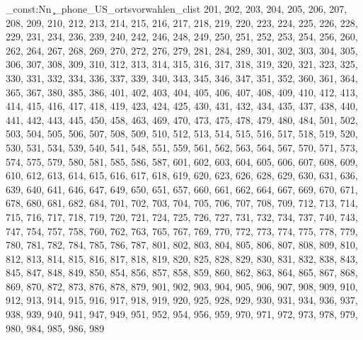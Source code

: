 \clist_const:Nn \c_phone_US_ortsvorwahlen_clist {201,
202,
203,
204,
205,
206,
207,
208,
209,
210,
212,
213,
214,
215,
216,
217,
218,
219,
220,
223,
224,
225,
226,
228,
229,
231,
234,
236,
239,
240,
242,
246,
248,
249,
250,
251,
252,
253,
254,
256,
260,
262,
264,
267,
268,
269,
270,
272,
276,
279,
281,
284,
289,
301,
302,
303,
304,
305,
306,
307,
308,
309,
310,
312,
313,
314,
315,
316,
317,
318,
319,
320,
321,
323,
325,
330,
331,
332,
334,
336,
337,
339,
340,
343,
345,
346,
347,
351,
352,
360,
361,
364,
365,
367,
380,
385,
386,
401,
402,
403,
404,
405,
406,
407,
408,
409,
410,
412,
413,
414,
415,
416,
417,
418,
419,
423,
424,
425,
430,
431,
432,
434,
435,
437,
438,
440,
441,
442,
443,
445,
450,
458,
463,
469,
470,
473,
475,
478,
479,
480,
484,
501,
502,
503,
504,
505,
506,
507,
508,
509,
510,
512,
513,
514,
515,
516,
517,
518,
519,
520,
530,
531,
534,
539,
540,
541,
548,
551,
559,
561,
562,
563,
564,
567,
570,
571,
573,
574,
575,
579,
580,
581,
585,
586,
587,
601,
602,
603,
604,
605,
606,
607,
608,
609,
610,
612,
613,
614,
615,
616,
617,
618,
619,
620,
623,
626,
628,
629,
630,
631,
636,
639,
640,
641,
646,
647,
649,
650,
651,
657,
660,
661,
662,
664,
667,
669,
670,
671,
678,
680,
681,
682,
684,
701,
702,
703,
704,
705,
706,
707,
708,
709,
712,
713,
714,
715,
716,
717,
718,
719,
720,
721,
724,
725,
726,
727,
731,
732,
734,
737,
740,
743,
747,
754,
757,
758,
760,
762,
763,
765,
767,
769,
770,
772,
773,
774,
775,
778,
779,
780,
781,
782,
784,
785,
786,
787,
801,
802,
803,
804,
805,
806,
807,
808,
809,
810,
812,
813,
814,
815,
816,
817,
818,
819,
820,
825,
828,
829,
830,
831,
832,
838,
843,
845,
847,
848,
849,
850,
854,
856,
857,
858,
859,
860,
862,
863,
864,
865,
867,
868,
869,
870,
872,
873,
876,
878,
879,
901,
902,
903,
904,
905,
906,
907,
908,
909,
910,
912,
913,
914,
915,
916,
917,
918,
919,
920,
925,
928,
929,
930,
931,
934,
936,
937,
938,
939,
940,
941,
947,
949,
951,
952,
954,
956,
959,
970,
971,
972,
973,
978,
979,
980,
984,
985,
986,
989}
